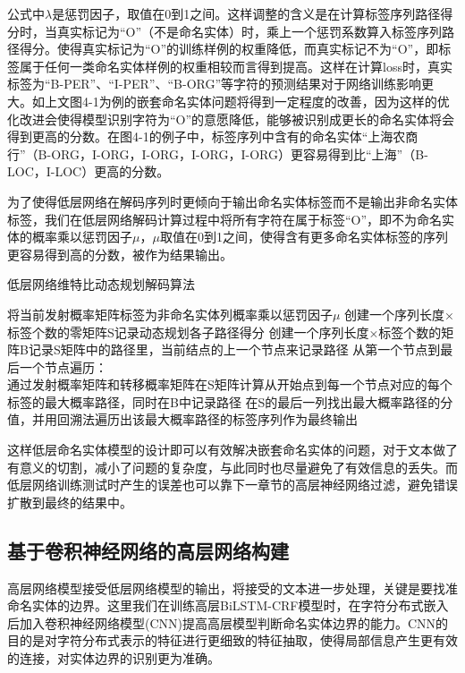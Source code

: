 \documentclass[winfonts,master,oneside,nobackinfo]{njuthesis}
\begin{document}
公式中$\lambda$是惩罚因子，取值在0到1之间。这样调整的含义是在计算标签序列路径得分时，当真实标记为“O”（不是命名实体）时，乘上一个惩罚系数算入标签序列路径得分。使得真实标记为“O”的训练样例的权重降低，而真实标记不为“O”，即标签属于任何一类命名实体样例的权重相较而言得到提高。这样在计算loss时，真实标签为“B-PER”、“I-PER”、“B-ORG”等字符的预测结果对于网络训练影响更大。如上文图4-1为例的嵌套命名实体问题将得到一定程度的改善，因为这样的优化改进会使得模型识别字符为“O”的意愿降低，能够被识别成更长的命名实体将会得到更高的分数。在图4-1的例子中，标签序列中含有的命名实体“上海农商行”（B-ORG，I-ORG，I-ORG，I-ORG，I-ORG）更容易得到比“上海”（B-LOC，I-LOC）更高的分数。

为了使得低层网络在解码序列时更倾向于输出命名实体标签而不是输出非命名实体标签，我们在低层网络解码计算过程中将所有字符在属于标签“O”，即不为命名实体的概率乘以惩罚因子$\mu$，$\mu$取值在0到1之间，使得含有更多命名实体标签的序列更容易得到高的分数，被作为结果输出。

\begin{algorithm}[H]
    \caption{低层网络维特比动态规划解码算法}
    \label{alg1}
    \begin{algorithmic}[1]
		\STATE 将当前发射概率矩阵标签为非命名实体列概率乘以惩罚因子$\mu$
        \STATE 创建一个序列长度×标签个数的零矩阵S记录动态规划各子路径得分
        \STATE 创建一个序列长度×标签个数的矩阵B记录S矩阵中的路径里，当前结点的上一个节点来记录路径
        \STATE 从第一个节点到最后一个节点遍历： \\
		通过发射概率矩阵和转移概率矩阵在S矩阵计算从开始点到每一个节点对应的每个标签的最大概率路径，同时在B中记录路径
		\STATE 在S的最后一列找出最大概率路径的分值，并用回溯法遍历出该最大概率路径的标签序列作为最终输出
    \end{algorithmic}
\end{algorithm}

这样低层命名实体模型的设计即可以有效解决嵌套命名实体的问题，对于文本做了有意义的切割，减小了问题的复杂度，与此同时也尽量避免了有效信息的丢失。而低层网络训练测试时产生的误差也可以靠下一章节的高层神经网络过滤，避免错误扩散到最终的结果中。

\subsection{基于卷积神经网络的高层网络构建}

高层网络模型接受低层网络模型的输出，将接受的文本进一步处理，关键是要找准命名实体的边界。这里我们在训练高层BiLSTM-CRF模型时，在字符分布式嵌入后加入卷积神经网络模型(CNN)提高高层模型判断命名实体边界的能力\cite{Ma}\cite{kang}。CNN的目的是对字符分布式表示的特征进行更细致的特征抽取，使得局部信息产生更有效的连接，对实体边界的识别更为准确。
\end{document}
